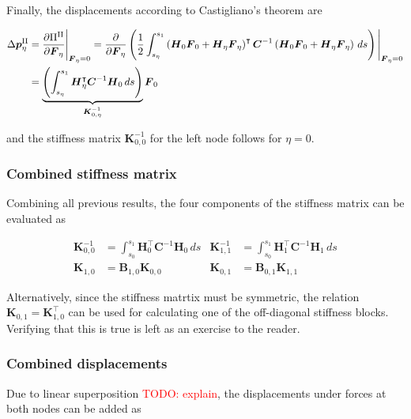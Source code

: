Finally, the displacements according to Castigliano's theorem are

\begin{align}
\Delta\boldsymbol{p}^{\mathrm{II}}_\eta &= \frac{\partial \Pi^{\mathrm{II}}}{\partial \boldsymbol{F}_\eta}\Bigg|_{\boldsymbol{F}_\eta = 0} = \frac{\partial}{\partial \boldsymbol{F}_\eta}\left(\frac{1}{2}\int_{s_\eta}^{s_1} \left(\boldsymbol{H}_{0}\boldsymbol{F}_0 + \boldsymbol{H}_{\eta}\boldsymbol{F}_\eta\right)^\intercal\boldsymbol{C}^{-1}\left(\boldsymbol{H}_{0}\boldsymbol{F}_0 + \boldsymbol{H}_{\eta}\boldsymbol{F}_\eta\right)\,ds\right)\Bigg|_{\boldsymbol{F}_\eta = 0} \notag \\
&= \underbrace{\left(\int_{s_\eta}^{s_1} \boldsymbol{H}_\eta^\intercal\boldsymbol{C}^{-1}\boldsymbol{H}_0\,ds\right)}_{\boldsymbol{K}^{-1}_{0,\eta}}\boldsymbol{F}_0
\end{align}

and the stiffness matrix $\boldsymbol{K}^{-1}_{0,0}$ for the left node follows for $\eta = 0$.

\subsubsection*{Combined stiffness matrix}

Combining all previous results, the four components of the stiffness matrix can be evaluated as

\begin{align}
\boldsymbol{K}^{-1}_{0,0} &= \int_{s_0}^{s_1} \boldsymbol{H}_0^\intercal\boldsymbol{C}^{-1}\boldsymbol{H}_0\,ds & \boldsymbol{K}^{-1}_{1,1} &= \int_{s_0}^{s_1} \boldsymbol{H}_1^\intercal\boldsymbol{C}^{-1}\boldsymbol{H}_1\,ds \\
\boldsymbol{K}_{1,0} &= \boldsymbol{B}_{1,0}\boldsymbol{K}_{0,0} & \boldsymbol{K}_{0,1} &= \boldsymbol{B}_{0,1}\boldsymbol{K}_{1,1}
\end{align}

Alternatively, since the stiffness matrtix must be symmetric, the relation $\boldsymbol{K}_{0,1} = \boldsymbol{K}_{1,0}^\intercal$ can be used for calculating one of the off-diagonal stiffness blocks.
Verifying that this is true is left as an exercise to the reader.

\subsubsection*{Combined displacements}

Due to linear superposition \textcolor{red}{TODO: explain}, the displacements under forces at both nodes can be added as

